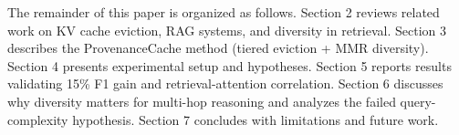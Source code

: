 The remainder of this paper is organized as follows. Section 2 reviews related work on KV cache eviction, RAG systems, and diversity in retrieval. Section 3 describes the ProvenanceCache method (tiered eviction + MMR diversity). Section 4 presents experimental setup and hypotheses. Section 5 reports results validating 15\% F1 gain and retrieval-attention correlation. Section 6 discusses why diversity matters for multi-hop reasoning and analyzes the failed query-complexity hypothesis. Section 7 concludes with limitations and future work.
